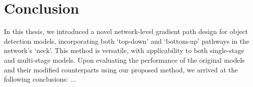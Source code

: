 \chapter{Conclusion}

In this thesis, we introduced a novel network-level gradient path design for object detection models, incorporating both ‘top-down’ and ‘bottom-up’ pathways in the network’s ‘neck’. This method is versatile, with applicability to both single-stage and multi-stage models. Upon evaluating the performance of the original models and their modified counterparts using our proposed method, we arrived at the following conclusions: ...
